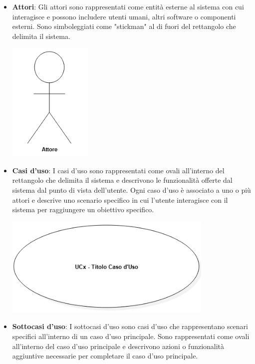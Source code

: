\begin{itemize}
	\item \textbf{Attori}: Gli attori sono rappresentati come entità esterne al sistema con cui interagisce e possono includere utenti umani, altri software o componenti esterni. Sono simboleggiati come "stickman" al di fuori del rettangolo che delimita il sistema.
	      \begin{center}
		      \includegraphics*[width=4cm]{../../../images/norme_di_progetto/attore.png}
	      \end{center} \newpage
	\item \textbf{Casi d'uso}: I casi d'uso sono rappresentati come ovali all'interno del rettangolo che delimita il sistema e descrivono le funzionalità offerte dal sistema dal punto di vista dell'utente. Ogni caso d'uso è associato a uno o più attori e descrive uno scenario specifico in cui l'utente interagisce con il sistema per raggiungere un obiettivo specifico.
	      \begin{center}
		      \includegraphics*[width=10cm]{../../../images/norme_di_progetto/casoDiUso.png}
	      \end{center}
	      \newpage
	\item \textbf{Sottocasi d'uso}: I sottocasi d'uso sono casi d'uso che rappresentano scenari specifici all'interno di un caso d'uso principale. Sono rappresentati come ovali all'interno del caso d'uso principale e descrivono azioni o funzionalità aggiuntive necessarie per completare il caso d'uso principale.

\end{itemize}
